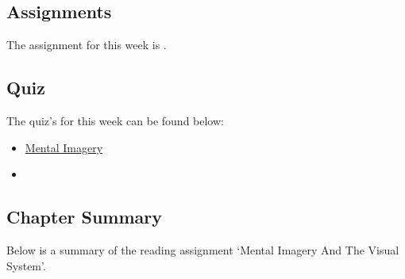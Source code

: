 \subsection{Assignments}

The assignment for this week is .  

\subsection{Quiz}

The quiz's for this week can be found below:

\begin{itemize}
    \item \href{https://applied.cs.colorado.edu/mod/quiz/view.php?id=49389}{Mental Imagery}  
    \item {}
\end{itemize}

\subsection{Chapter Summary}

Below is a summary of the reading assignment `Mental Imagery And The Visual System'.

